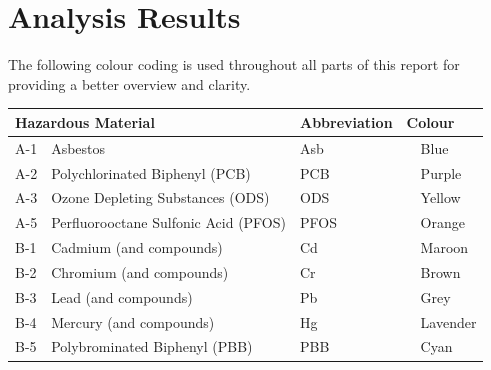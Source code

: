 \documentclass{article}
\begin{document}
\section{Analysis Results}

The following colour coding is used throughout all parts of this report for
providing a better overview and clarity.

\renewcommand{\arraystretch}{1.4}
\begin{center}
\begin{table}[H]
\begin{tabular}{|ll|l|ll|}
\hline
\multicolumn{2}{|l|}{\textbf{Hazardous Material}}          & \textbf{Abbreviation} & \multicolumn{2}{l|}{\textbf{Colour}}                   \\ \hline
\multicolumn{1}{|l|}{A-1} & Asbestos                       & Asb                   & \multicolumn{1}{l|}{\cellcolor[HTML]{3531FF}} & Blue   \\ \hline
\multicolumn{1}{|l|}{A-2} & Polychlorinated Biphenyl (PCB) & PCB                   & \multicolumn{1}{l|}{\cellcolor[HTML]{6200C9}} & Purple \\ \hline
\multicolumn{1}{|l|}{A-3}    &  Ozone Depleting Substances (ODS)                               &         ODS   &           \multicolumn{1}{l|}{\cellcolor[HTML]{EBF909}} & Yellow      \\ \hline
\multicolumn{1}{|l|}{A-5 }    &  Perfluorooctane Sulfonic Acid (PFOS)                               &         PFOS    &           \multicolumn{1}{l|}{\cellcolor[HTML]{F9BA09}} & Orange      \\ \hline
\multicolumn{1}{|l|}{B-1 }    &  Cadmium (and compounds)                               &         Cd    &           \multicolumn{1}{l|}{\cellcolor[HTML]{900C3F}} & Maroon      \\ \hline
\multicolumn{1}{|l|}{B-2 }    &  Chromium (and compounds)                                &         Cr    &           \multicolumn{1}{l|}{\cellcolor[HTML]{9F4C26}} & Brown      \\ \hline
\multicolumn{1}{|l|}{B-3 }    &  Lead (and compounds)                                &         Pb    &           \multicolumn{1}{l|}{\cellcolor[HTML]{908D8C}} & Grey      \\ \hline
\multicolumn{1}{|l|}{B-4 }    &  Mercury (and compounds)                                &         Hg    &           \multicolumn{1}{l|}{\cellcolor[HTML]{A778E9}} & Lavender      \\ \hline
\multicolumn{1}{|l|}{B-5}    &  Polybrominated Biphenyl (PBB)                                &         PBB    &           \multicolumn{1}{l|}{\cellcolor[HTML]{18B0F5}} & Cyan      \\ \hline

\end{tabular}
\end{table}
\end{center}
\end{document}
